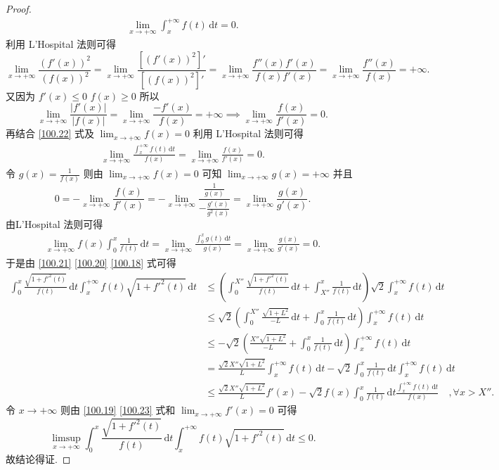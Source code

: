 \documentclass[../../main.tex]{subfiles}%
\begin{document}
\begin{proof}
\begin{align}
\lim_{x \to +\infty} \int_x^{+\infty} f(t) \, \mathrm{d}t = 0 \label{100.22}.
\end{align}
利用 L’Hospital 法则可得
\[
\lim_{x \to +\infty} \frac{(f'(x))^2}{(f(x))^2} = \lim_{x \to +\infty} \frac{[(f'(x))^2]'}{[(f(x))^2]'} = \lim_{x \to +\infty} \frac{f''(x)f'(x)}{f(x)f'(x)} = \lim_{x \to +\infty} \frac{f''(x)}{f(x)} = +\infty.
\]
又因为 \( f'(x) \leqslant 0 \) \( f(x) \geqslant 0 \) 所以
\[
\lim_{x \to +\infty} \frac{|f'(x)|}{|f(x)|} = \lim_{x \to +\infty} \frac{-f'(x)}{f(x)} = +\infty \implies \lim_{x \to +\infty} \frac{f(x)}{f'(x)} = 0.
\]
再结合 \eqref{100.22} 式及 \( \lim_{x \to +\infty} f(x) = 0 \) 利用 L’Hospital 法则可得
\begin{align}
\lim_{x \to +\infty} \frac{\int_x^{+\infty} f(t) \, \mathrm{d}t}{f(x)} = \lim_{x \to +\infty} \frac{f(x)}{f'(x)} = 0 \label{100.23}.
\end{align}
令 \( g(x) = \frac{1}{f(x)} \) 则由 \( \lim_{x \to +\infty} f(x) = 0 \) 可知 \( \lim_{x \to +\infty} g(x) = +\infty \) 并且
\[
0 = -\lim_{x \to +\infty} \frac{f(x)}{f'(x)} = -\lim_{x \to +\infty} \frac{\frac{1}{g(x)}}{-\frac{g'(x)}{g^2(x)}} = \lim_{x \to +\infty} \frac{g(x)}{g'(x)}.
\]
由L’Hospital 法则可得
\begin{align}
\lim_{x \to +\infty} f(x) \int_0^x \frac{1}{f(t)} \, \mathrm{d}t = \lim_{x \to +\infty} \frac{\int_0^x g(t) \, \mathrm{d}t}{g(x)} = \lim_{x \to +\infty} \frac{g(x)}{g'(x)} = 0 \label{100.19}.
\end{align}
于是由 \eqref{100.21} \eqref{100.20} \eqref{100.18} 式可得
\begin{align*}
\int_0^x \frac{\sqrt{1 + f'^2(t)}}{f(t)} \, \mathrm{d}t \int_x^{+\infty} f(t)\sqrt{1 + f'^2(t)} \, \mathrm{d}t 
&\leqslant \left( \int_0^{X''} \frac{\sqrt{1 + f'^2(t)}}{f(t)} \, \mathrm{d}t + \int_{X''}^x \frac{1}{f(t)} \, \mathrm{d}t \right) \sqrt{2} \int_x^{+\infty} f(t) \, \mathrm{d}t \\
&\leqslant \sqrt{2} \left( \int_0^{X''} \frac{\sqrt{1 + L^2}}{-L} \, \mathrm{d}t + \int_0^x \frac{1}{f(t)} \, \mathrm{d}t \right) \int_x^{+\infty} f(t) \, \mathrm{d}t \\
&\leqslant -\sqrt{2} \left( \frac{X'' \sqrt{1 + L^2}}{-L} + \int_0^x \frac{1}{f(t)} \, \mathrm{d}t \right) \int_x^{+\infty} f(t) \, \mathrm{d}t \\
&= \frac{\sqrt{2} X'' \sqrt{1 + L^2}}{L} \int_x^{+\infty} f(t) \, \mathrm{d}t - \sqrt{2} \int_0^x \frac{1}{f(t)} \, \mathrm{d}t \int_x^{+\infty} f(t) \, \mathrm{d}t \\
&\leqslant \frac{\sqrt{2} X'' \sqrt{1 + L^2}}{L} f'(x) - \sqrt{2} f(x) \int_0^x \frac{1}{f(t)} \, \mathrm{d}t \frac{\int_x^{+\infty} f(t) \, \mathrm{d}t}{f(x)} \quad ,\forall x > X''.
\end{align*}
令 \( x \to +\infty \) 则由 \eqref{100.19} \eqref{100.23} 式和 \( \lim_{x \to +\infty} f'(x) = 0 \) 可得
\[
\limsup_{x \to +\infty} \int_0^x \frac{\sqrt{1 + f'^2(t)}}{f(t)} \, \mathrm{d}t \int_x^{+\infty} f(t)\sqrt{1 + f'^2(t)} \, \mathrm{d}t \leqslant 0.
\]
故结论得证.
\end{proof}
\end{document}
